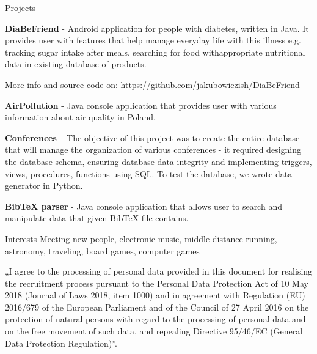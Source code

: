 \documentclass{resume} %
\begin{document}

\begin{rSection}{Projects}

\textbf{DiaBeFriend} - Android application for people with diabetes, written in Java. It provides user with features that
help manage everyday life with this illness e.g. tracking sugar intake after meals, searching for food withappropriate nutritional data in existing database of products.

 More info and source code on: \url{https://github.com/jakubowiczish/DiaBeFriend}

\textbf{AirPollution} - Java console application that provides user with various information about air quality in Poland.

\textbf{Conferences} – The objective of this project was to create the entire database that will manage the organization
of various conferences - it required designing the database schema, ensuring database data integrity and
implementing triggers, views, procedures, functions using SQL. To test the database, we wrote data generator in
Python.

\textbf{BibTeX parser} - Java console application that allows user to search and manipulate data that given BibTeX file
contains.

\end{rSection}


\begin{rSection}{Interests}
Meeting new people, electronic music, middle-distance running, astronomy, traveling, board games, computer games
\end{rSection}


\vfill
\footnotesize „I agree to the processing of personal data provided in this document for realising the recruitment process
pursuant to the Personal Data Protection Act of 10 May 2018 (Journal of Laws 2018, item 1000) and in
agreement with Regulation (EU) 2016/679 of the European Parliament and of the Council of 27 April 2016 on
the protection of natural persons with regard to the processing of personal data and on the free movement of
such data, and repealing Directive 95/46/EC (General Data Protection Regulation)”.
\end{document}
